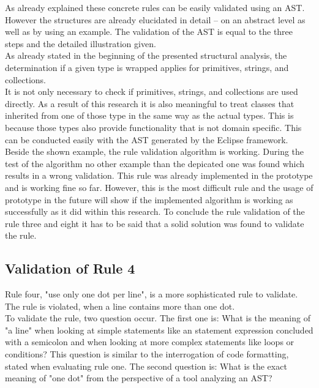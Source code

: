 As already explained these concrete rules can be easily validated using an \acf{AST}. However the structures are already elucidated in detail -- on an abstract level as well as by using an example. The validation of the \acf{AST} is equal to the three steps and the detailed illustration given.
\\

As already stated in the beginning of the presented structural analysis, the determination if a given type is wrapped applies for primitives, strings, and collections. 
\\

It is not only necessary to check if primitives, strings, and collections are used directly. As a result of this research it is also meaningful to treat classes that inherited from one of those type in the same way as the actual types. This is because those types also provide functionality that is not domain specific. This can be conducted easily with the \acf{AST} generated by the Eclipse framework. 
\\

Beside the shown example, the rule validation algorithm is working. During the test of the algorithm no other example than the depicated one was found which results in a wrong validation. This rule was already implemented in the prototype and is working fine so far. However, this is the most difficult rule and the usage of prototype in the future will show if the implemented algorithm is working as successfully as it did within this research. To conclude the rule validation of the rule three and eight it has to be said that a solid solution was found to validate the rule.
\\

\subsection*{Validation of Rule 4}
Rule four, "use only one dot per line", is a more sophisticated rule to validate. The rule is violated, when a line contains more than one dot. 
\\

To validate the rule, two question occur. The first one is: What is the meaning of "a line" when looking at simple statements like an statement expression concluded with a semicolon and when looking at more complex statements like loops or conditions? This question is similar to the interrogation of code formatting, stated when evaluating rule one. The second question is: What is the exact meaning of "one dot" from the perspective of a tool analyzing an \acf{AST}?
\\

